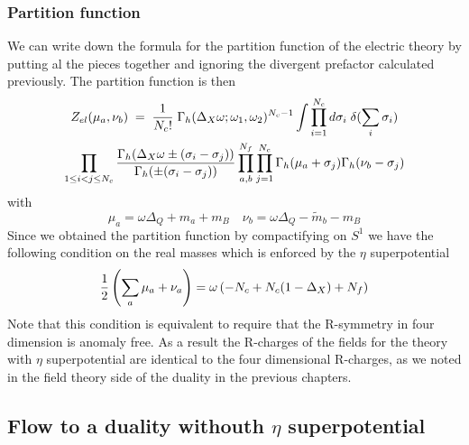 \subsubsection{Partition function}
We can write down the formula for the partition function of the electric theory by putting al the pieces together and ignoring the divergent prefactor calculated previously. 
The partition function is then
\begin{multline}
Z_{el} ( \mu_a , \nu_b ) \; = 
\; {1 \over N_c ! } \;
\Gamma_h ( \Delta_X \omega ; \omega_1 , \omega_2)^{N_c-1}
\int
\prod_{i=1}^{N_c} d \sigma_i \; \delta( \sum_i \sigma_i)  \\
 \prod_{ 1 \leq i<j \leq N_c} \frac{ \Gamma_h( \Delta_X \omega \pm (\sigma_i - \sigma_j)) }{ \Gamma_h ( \pm (\sigma_i - \sigma_j) )}
 \prod_{a,b}^{N_f} \prod_{j=1}^{N_c} \Gamma_h ( \mu_a + \sigma_j) \Gamma_h ( \nu_b - \sigma_j)
\end{multline}
with 
\begin{equation}
 \mu_a = \omega \Delta_Q + m_a + m_B  \quad  \nu_b = \omega \Delta_Q - \tilde m_b - m_B
\end{equation}
Since we obtained the partition function by compactifying on $S^1$ we have the following condition on the real masses which is enforced by the $\eta$ superpotential
\begin{equation}
  { 1 \over 2 }\left(  \sum_a \mu_a + \nu_a  \right) = \omega \left( - N_c + N_c (1 - \Delta_X )  + N_f  \right)
  \label{eqn:R-symm Anomaly}
\end{equation}
Note that this condition is equivalent to require that the R-symmetry in four dimension is anomaly free. 
As a result the R-charges of the fields for the theory with $\eta$ superpotential are identical to the four dimensional R-charges, as we noted in the field theory side of the duality in the previous chapters.\\




\subsection{Flow to a duality withouth $\eta$ superpotential}

